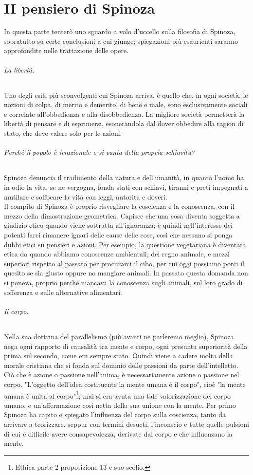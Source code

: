 \chapter{II pensiero di Spinoza}
In questa parte tenterò uno sguardo a volo d'uccello sulla filosofia di Spinoza, sopratutto su certe conclusioni a cui giunge; spiegazioni più esaurienti saranno approfondite nelle trattazione delle opere.
\subparagraph{La libertà.} Uno degli esiti più sconvolgenti cui Spinoza arriva, è quello che, in ogni società, le nozioni di colpa, di merito e demerito, di bene e male, sono esclusivamente sociali e correlate all'obbedienza e alla disobbedienza. La migliore società  permetterà la libertà di pensare e di esprimersi, esonerandola dal dover obbedire alla ragion di stato, che deve valere solo per le azioni.
\subparagraph{Perché il popolo è irrazionale e si vanta della propria schiavitù?} Spinoza denuncia il tradimento della natura e dell'umanità, in quanto l'uomo ha in odio la vita, se ne vergogna, fonda stati con schiavi, tiranni e preti impegnati a mutilare e soffocare la vita con leggi, autorità e doveri.\\
Il compito di Spinoza è proprio risvegliare la coscienza e la conoscenza, con il mezzo della dimostrazione geometrica. Capisce che una cosa diventa soggetta a giudizio etico quando viene sottratta all'ignoranza; è quindi nell'interesse dei potenti farci rimanere ignari delle cause delle cose, così che nessuno si ponga dubbi etici su pensieri e azioni. Per esempio, la questione vegetariana è diventata etica da quando abbiamo conoscenze ambientali, del regno animale, e mezzi superiori rispetto al passato per procurarci il cibo, per cui oggi possiamo porci il quesito se sia giusto oppure no mangiare animali. In passato questa domanda non si poneva, proprio perché mancava la conoscenza sugli animali, sul loro grado di sofferenza e sulle alternative alimentari.
\subparagraph{Il corpo.} Nella sua dottrina del parallelismo (più avanti ne parleremo meglio), Spinoza nega ogni rapporto di causalità tra mente e corpo, ogni presunta superiorità della prima sul secondo, come era sempre stato. Quindi viene a cadere molta della morale cristiana che si fonda sul dominio delle passioni da parte dell'intelletto.\\
Ciò che è azione o passione nell'anima, è necessariamente azione o passione nel corpo. "L'oggetto dell'idea costituente la mente umana è il corpo", cioè "la mente umana è unita al corpo"\footnote{Ethica parte 2 proposizione 13 e suo scolio.}; mai si era avuta una tale valorizzazione del corpo umano, e un'affermazione così netta della sua unione con la mente. Per primo Spinoza ha capito e spiegato l'influenza del corpo sulla coscienza, tanto da arrivare a teorizzare, seppur con termini desueti, l'inconscio e tutte quelle pulsioni di cui è difficile avere consapevolezza, derivate dal corpo e che influenzano la mente.
